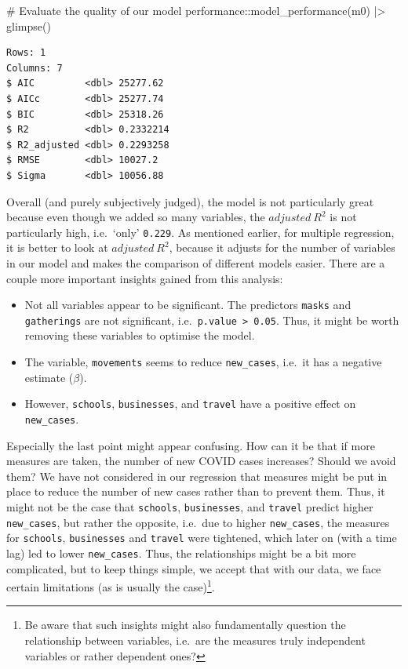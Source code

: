 \documentclass[
  letterpaper,
  DIV=11,
  numbers=noendperiod]{scrreprt}
\newenvironment{Shaded}{\begin{snugshade}}{\end{snugshade}}
\newcommand{\CommentTok}[1]{\textcolor[rgb]{0.37,0.37,0.37}{#1}}
\newcommand{\FunctionTok}[1]{\textcolor[rgb]{0.28,0.35,0.67}{#1}}
\newcommand{\NormalTok}[1]{\textcolor[rgb]{0.00,0.23,0.31}{#1}}
\newcommand{\SpecialCharTok}[1]{\textcolor[rgb]{0.37,0.37,0.37}{#1}}
\begin{document}
\begin{Shaded}
\begin{Highlighting}[]
\CommentTok{\# Evaluate the quality of our model}
\NormalTok{performance}\SpecialCharTok{::}\FunctionTok{model\_performance}\NormalTok{(m0) }\SpecialCharTok{|\textgreater{}}
  \FunctionTok{glimpse}\NormalTok{()}
\end{Highlighting}
\end{Shaded}

\begin{verbatim}
Rows: 1
Columns: 7
$ AIC         <dbl> 25277.62
$ AICc        <dbl> 25277.74
$ BIC         <dbl> 25318.26
$ R2          <dbl> 0.2332214
$ R2_adjusted <dbl> 0.2293258
$ RMSE        <dbl> 10027.2
$ Sigma       <dbl> 10056.88
\end{verbatim}

Overall (and purely subjectively judged), the model is not particularly
great because even though we added so many variables, the
\(adjusted \ R^2\) is not particularly high, i.e.~`only' \texttt{0.229}.
As mentioned earlier, for multiple regression, it is better to look at
\(adjusted \ R^2\), because it adjusts for the number of variables in
our model and makes the comparison of different models easier. There are
a couple more important insights gained from this analysis:

\begin{itemize}
\item
  Not all variables appear to be significant. The predictors
  \texttt{masks} and \texttt{gatherings} are not significant,
  i.e.~\texttt{p.value\ \textgreater{}\ 0.05}. Thus, it might be worth
  removing these variables to optimise the model.
\item
  The variable, \texttt{movements} seems to reduce \texttt{new\_cases},
  i.e.~it has a negative estimate (\(\beta\)).
\item
  However, \texttt{schools}, \texttt{businesses}, and \texttt{travel}
  have a positive effect on \texttt{new\_cases}.
\end{itemize}

Especially the last point might appear confusing. How can it be that if
more measures are taken, the number of new COVID cases increases? Should
we avoid them? We have not considered in our regression that measures
might be put in place to reduce the number of new cases rather than to
prevent them. Thus, it might not be the case that \texttt{schools},
\texttt{businesses}, and \texttt{travel} predict higher
\texttt{new\_cases}, but rather the opposite, i.e.~due to higher
\texttt{new\_cases}, the measures for \texttt{schools},
\texttt{businesses} and \texttt{travel} were tightened, which later on
(with a time lag) led to lower \texttt{new\_cases}. Thus, the
relationships might be a bit more complicated, but to keep things
simple, we accept that with our data, we face certain limitations (as is
usually the case)\footnote{Be aware that such insights might also
  fundamentally question the relationship between variables, i.e.~are
  the measures truly independent variables or rather dependent ones?}.
\end{document}
